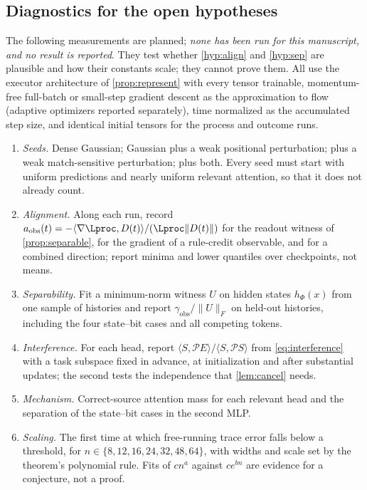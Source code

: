 \subsection{Diagnostics for the open hypotheses}\label{app:diagnostics}
The following measurements are planned; \emph{none has been run for this manuscript, and no result is reported}. They test whether
\ref{hyp:align} and \ref{hyp:sep} are plausible and how their constants scale; they cannot prove them. All use the executor architecture of
\cref{prop:represent} with every tensor trainable, momentum-free full-batch or small-step gradient descent as the approximation to flow
(adaptive optimizers reported separately), time normalized as the accumulated step size, and identical initial tensors for the process and
outcome runs.
\begin{enumerate}[leftmargin=*,itemsep=2pt]
\item \emph{Seeds.} Dense Gaussian; Gaussian plus a weak positional perturbation; plus a weak match-sensitive perturbation; plus both. Every
 seed must start with uniform predictions and nearly uniform relevant attention, so that it does not already count.
\item \emph{Alignment.} Along each run, record $a_{\mathrm{obs}}(t)=-\langle\nabla\Lproc,D(t)\rangle/(\Lproc\|D(t)\|)$ for the readout witness of
 \cref{prop:separable}, for the gradient of a rule-credit observable, and for a combined direction; report minima and lower quantiles over
 checkpoints, not means.
\item \emph{Separability.} Fit a minimum-norm witness $U$ on hidden states $h_\Phi(x)$ from one sample of histories and report
 $\gamma_{\mathrm{obs}}/\|U\|_F$ on held-out histories, including the four state--bit cases and all competing tokens.
\item \emph{Interference.} For each head, report $\langle S,\mathcal PE\rangle/\langle S,\mathcal PS\rangle$ from \cref{eq:interference} with a task subspace
 fixed in advance, at initialization and after substantial updates; the second tests the independence that \cref{lem:cancel} needs.
\item \emph{Mechanism.} Correct-source attention mass for each relevant head and the separation of the state--bit cases in the second MLP.
\item \emph{Scaling.} The first time at which free-running trace error falls below a threshold, for $n\in\{8,12,16,24,32,48,64\}$, with widths and
 scale set by the theorem's polynomial rule. Fits of $cn^a$ against $ce^{bn}$ are evidence for a conjecture, not a proof.
\end{enumerate}
